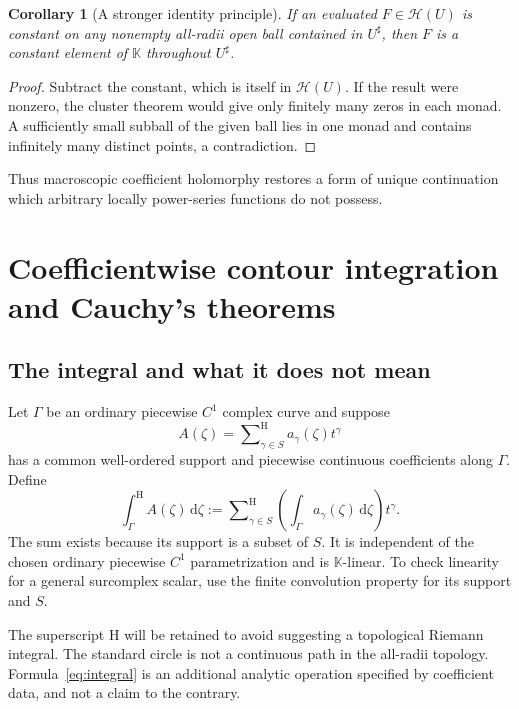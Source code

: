 \documentclass[11pt,oneside]{article}
\newtheorem{corollary}[theorem]{Corollary}
\theoremstyle{definition}\newtheorem{definition}[theorem]{Definition}
\newcommand{\K}{\mathbb K}
\newcommand{\HH}{\mathcal H}
\newcommand{\dd}{\,\mathrm d}
\newcommand{\Hsum}{\mathop{\sum}\nolimits^{\mathrm H}}
\newcommand{\htop}{\mathrm H}
\begin{document}
\begin{corollary}[A stronger identity principle]\label{cor:localidentity}
If an evaluated $F\in\HH(U)$ is constant on any nonempty all-radii open ball contained in $U^\sharp$, then $F$ is a constant element of $\K$ throughout $U^\sharp$.
\end{corollary}
\begin{proof}
Subtract the constant, which is itself in $\HH(U)$. If the result were nonzero, the cluster theorem would give only finitely many zeros in each monad. A sufficiently small subball of the given ball lies in one monad and contains infinitely many distinct points, a contradiction.
\end{proof}
Thus macroscopic coefficient holomorphy restores a form of unique continuation which arbitrary locally power-series functions do not possess.

\section{Coefficientwise contour integration and Cauchy's theorems}\label{sec:cauchy}
\subsection{The integral and what it does not mean}
Let $\Gamma$ be an ordinary piecewise $C^1$ complex curve and suppose
\[
 A(\zeta)=\Hsum_{\gamma\in S}a_\gamma(\zeta)t^\gamma
\]
has a common well-ordered support and piecewise continuous coefficients along $\Gamma$. Define
\begin{equation}\label{eq:integral}
 \int_\Gamma^{\htop}A(\zeta)\dd\zeta
 :=\Hsum_{\gamma\in S}
 \left(\int_\Gamma a_\gamma(\zeta)\dd\zeta\right)t^\gamma.
\end{equation}
The sum exists because its support is a subset of $S$. It is independent of the chosen ordinary piecewise $C^1$ parametrization and is $\K$-linear. To check linearity for a general surcomplex scalar, use the finite convolution property for its support and $S$.

The superscript $\htop$ will be retained to avoid suggesting a topological Riemann integral. The standard circle is not a continuous path in the all-radii topology. Formula~\eqref{eq:integral} is an additional analytic operation specified by coefficient data, and not a claim to the contrary.
\end{document}
